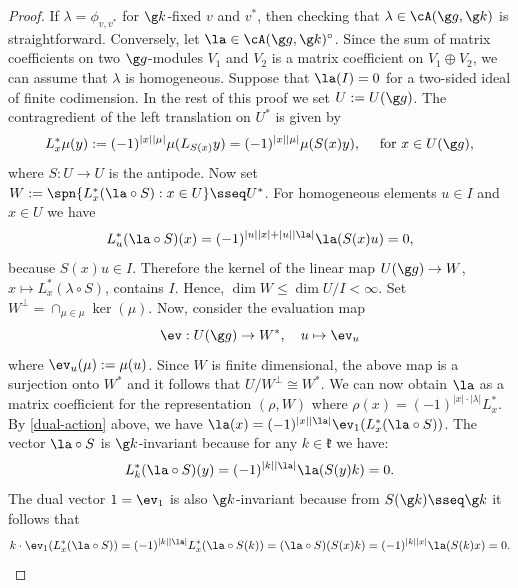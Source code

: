 \documentclass[11pt]{amsart}
\begin{document}
\begin{proof}
If $\lambda=\phi_{v,v^*}$ for $\g  k$-fixed $v$ and $v^*$, then checking that $\lambda\in\cA(\g g,\g k)$ is straightforward. Conversely, 
	let $\la\in \cA(\g g,\g k)^\circ$. Since the sum of matrix coefficients on two $\g g$-modules $V_1$ and $V_2$ is a matrix coefficient on $V_1\oplus V_2$,  we can assume that $\lambda$ is homogeneous. Suppose that  $\la(I)=0$ for a two-sided ideal of finite codimension. In the rest of this proof we set $U:=U(\g g)$.
	The contragredient of the left translation on $U^*$ is given by
	\begin{equation}\label{dual-action}
	L_x^*\mu(y):=(-1)^{|x||\mu|}\mu(L_{S(x)}y)=(-1)^{|x||\mu|}\mu(S(x)y), \quad\text{ for }x\in U(\g g),
	\end{equation}
	where $S:U\to U$ is the antipode. 
	Now set $W:=\spn\{L_x^*(\la\circ S): x\in U \}\sseq U^*$. For homogeneous elements $u\in I$ and $x\in U$ we have
	\[
	L_u^*(\la\circ S)(x)=(-1)^{|u||x|+|u||\la|}\la(S(x)u)=0,
	\]
	because $S(x)u\in I$. Therefore the kernel of the linear map $ U(\g g)\rightarrow W$, $ x \mapsto L_x^* (\lambda \circ S)$, contains $I$. Hence, $\dim W\leq \dim U/I<\infty$. Set
	$W^{\perp}=\cap_{\mu\in\mu}\ker(\mu)$.
	Now, consider the evaluation map
	\[ \ev:U(\g g)\to W^*,\quad u\mapsto \ev_u\]
	where
	$\ev_u(\mu):=\mu(u)$. Since $W$ is finite dimensional, the above map is a surjection onto $W^*$ and it follows that $U/W^\perp\cong W^*$. We can now obtain $\la$ as a matrix coefficient for the representation $(\rho,W)$ where  $\rho(x)=(-1)^{|x|\cdot|\lambda|}L_x^*$. 
By \eqref{dual-action} above, we have
	$
	\la(x)=(-1)^{|x||\la|}\ev_1(L_x^*(\la\circ S))
	$.
	The vector $\la\circ S$ is $\g k$-invariant because for any $k \in \mathfrak k$ we have:
	\[
	L_k^*(\la\circ S)(y)=(-1)^{|k||\la|}\la(S(y)k)=0.
	\]
	The dual vector $1=\ev_1$ is also $\g k$-invariant because from $S(\g k)\sseq \g k$ it follows that
	\[k\cdot \ev_1(L_x^*(\la\circ S))=(-1)^{|k||\la|}
	L_x^*(\la\circ S(k))=(\la\circ S)(S(x)k)=(-1)^{|k||x|}\la (S(k)x)=0. 
\qedhere \] \end{proof}
	
\end{document}
